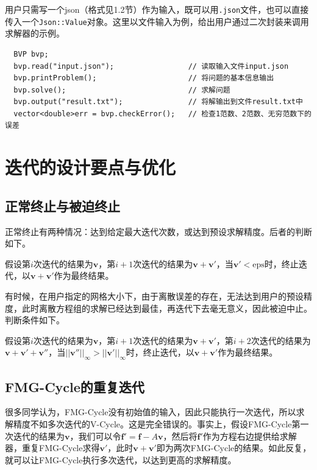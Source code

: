 \documentclass[lang=cn,10pt]{elegantbook}
\begin{document}
用户只需写一个json（格式见1.2节）作为输入，既可以用\verb|.json|文件，也可以直接传入一个\verb|Json::Value|对象。这里以文件输入为例，给出用户通过二次封装来调用求解器的示例。
\begin{lstlisting}
  BVP bvp;
  bvp.read("input.json");                 // 读取输入文件input.json
  bvp.printProblem();                     // 将问题的基本信息输出
  bvp.solve();                            // 求解问题
  bvp.output("result.txt");               // 将解输出到文件result.txt中
  vector<double>err = bvp.checkError();   // 检查1范数、2范数、无穷范数下的误差
\end{lstlisting}

\section{迭代的设计要点与优化}

\subsection{正常终止与被迫终止}

正常终止有两种情况：达到给定最大迭代次数，或达到预设求解精度。后者的判断如下。

假设第$i$次迭代的结果为$\mathbf{v}$，第$i+1$次迭代的结果为$\mathbf{v}+\mathbf{v}'$，当$\mathbf{v}'<\text{eps}$时，终止迭代，以$\mathbf{v}+\mathbf{v}'$作为最终结果。

有时候，在用户指定的网格大小下，由于离散误差的存在，无法达到用户的预设精度，此时离散方程组的求解已经达到最佳，再迭代下去毫无意义，因此被迫中止。判断条件如下。

假设第$i$次迭代的结果为$\mathbf{v}$，第$i+1$次迭代的结果为$\mathbf{v}+\mathbf{v}'$，第$i+2$次迭代的结果为$\mathbf{v}+\mathbf{v}'+\mathbf{v}''$，当$||\mathbf{v}''||_\infty>||\mathbf{v}'||_\infty$时，终止迭代，以$\mathbf{v}+\mathbf{v}'$作为最终结果。

\subsection{FMG-Cycle的重复迭代}

很多同学认为，FMG-Cycle没有初始值的输入，因此只能执行一次迭代，所以求解精度不如多次迭代的V-Cycle。这是完全错误的。事实上，假设FMG-Cycle第一次迭代的结果为$\mathbf{v}$，我们可以令$\mathbf{f}'=\mathbf{f}-A\mathbf{v}$，然后将$\mathbf{f'}$作为方程右边提供给求解器，重复FMG-Cycle求得$\mathbf{v}'$，此时$\mathbf{v}+\mathbf{v}'$即为两次FMG-Cycle的结果。如此反复，就可以让FMG-Cycle执行多次迭代，以达到更高的求解精度。
\end{document}
